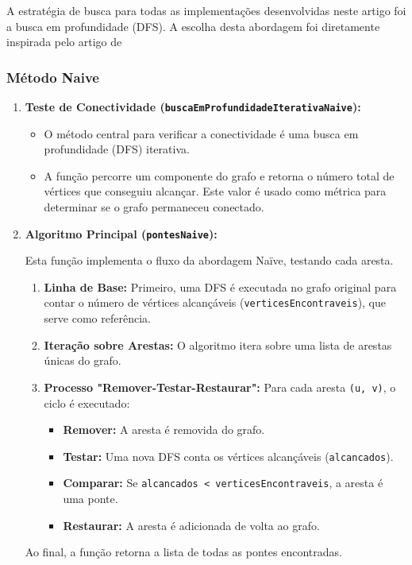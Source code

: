 \documentclass[12pt]{article}
\begin{document}
A estratégia de busca para todas as implementações desenvolvidas neste artigo foi a busca em profundidade (DFS). A escolha desta abordagem foi diretamente inspirada pelo artigo de  \cite{Tarjan1972}

\subsubsection{Método Naive}

\begin{enumerate}
    \item \textbf{Teste de Conectividade (\texttt{buscaEmProfundidadeIterativaNaive}):}
    \begin{itemize}
        \item O m\'etodo central para verificar a conectividade \'e uma busca em profundidade (DFS) iterativa.
        \item A fun\c{c}\~ao percorre um componente do grafo e retorna o n\'umero total de v\'ertices que conseguiu alcan\c{car}. Este valor \'e usado como m\'etrica para determinar se o grafo permaneceu conectado.
    \end{itemize}

    \item \textbf{Algoritmo Principal (\texttt{pontesNaive}):}
    
    Esta fun\c{c}\~ao implementa o fluxo da abordagem Na\"ive, testando cada aresta.
    \begin{enumerate}
        \item \textbf{Linha de Base:} Primeiro, uma DFS \'e executada no grafo original para contar o n\'umero de v\'ertices alcan\c{c}\'aveis (\texttt{verticesEncontraveis}), que serve como refer\^encia.
        \item \textbf{Itera\c{c}\~ao sobre Arestas:} O algoritmo itera sobre uma lista de arestas \'unicas do grafo.
        \item \textbf{Processo "Remover-Testar-Restaurar":} Para cada aresta \texttt{(u, v)}, o ciclo \'e executado:
        \begin{itemize}
            \item \textbf{Remover:} A aresta \'e removida do grafo.
            \item \textbf{Testar:} Uma nova DFS conta os v\'ertices alcan\c{c}\'aveis (\texttt{alcancados}).
            \item \textbf{Comparar:} Se \texttt{alcancados < verticesEncontraveis}, a aresta \'e uma ponte.
            \item \textbf{Restaurar:} A aresta \'e adicionada de volta ao grafo.
        \end{itemize}
    \end{enumerate}
    Ao final, a fun\c{c}\~ao retorna a lista de todas as pontes encontradas.
    

\end{enumerate}
\end{document}
